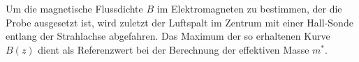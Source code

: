 
Um die magnetische Flussdichte $B$ im Elektromagneten zu bestimmen,
    der die Probe ausgesetzt ist,
wird zuletzt der Luftspalt im Zentrum mit einer Hall-Sonde entlang der Strahlachse abgefahren.
Das Maximum der so erhaltenen Kurve $B(z)$ dient als Referenzwert bei der Berechnung der effektiven Masse $m^*$.
